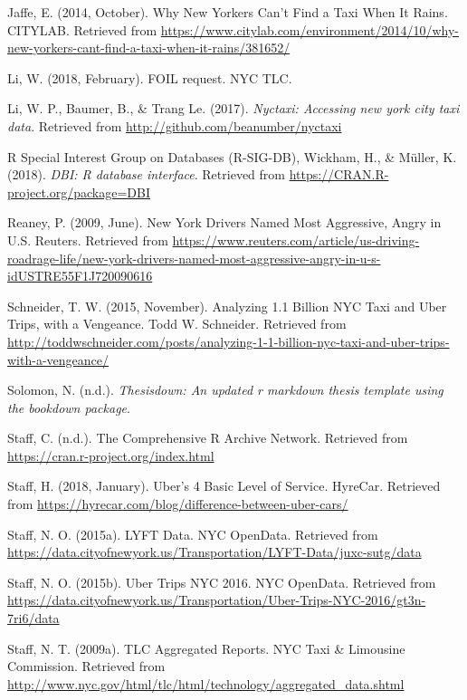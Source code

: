 \documentclass[12pt,twoside]{reedthesis}
\theoremstyle{definition}
\theoremstyle{definition}
\theoremstyle{definition}
\theoremstyle{remark}
\begin{document}
\hypertarget{ref-citylab}{}
Jaffe, E. (2014, October). Why New Yorkers Can't Find a Taxi When It
Rains. CITYLAB. Retrieved from
\url{https://www.citylab.com/environment/2014/10/why-new-yorkers-cant-find-a-taxi-when-it-rains/381652/}

\hypertarget{ref-foirequest}{}
Li, W. (2018, February). FOIL request. NYC TLC.

\hypertarget{ref-pkgnyctaxi}{}
Li, W. P., Baumer, B., \& Trang Le. (2017). \emph{Nyctaxi: Accessing new
york city taxi data}. Retrieved from
\url{http://github.com/beanumber/nyctaxi}

\hypertarget{ref-pkgDBI}{}
R Special Interest Group on Databases (R-SIG-DB), Wickham, H., \&
Müller, K. (2018). \emph{DBI: R database interface}. Retrieved from
\url{https://CRAN.R-project.org/package=DBI}

\hypertarget{ref-reaney2009}{}
Reaney, P. (2009, June). New York Drivers Named Most Aggressive, Angry
in U.S. Reuters. Retrieved from
\url{https://www.reuters.com/article/us-driving-roadrage-life/new-york-drivers-named-most-aggressive-angry-in-u-s-idUSTRE55F1J720090616}

\hypertarget{ref-schneider2015}{}
Schneider, T. W. (2015, November). Analyzing 1.1 Billion NYC Taxi and
Uber Trips, with a Vengeance. Todd W. Schneider. Retrieved from
\url{http://toddwschneider.com/posts/analyzing-1-1-billion-nyc-taxi-and-uber-trips-with-a-vengeance/}

\hypertarget{ref-pkgthesisdown}{}
Solomon, N. (n.d.). \emph{Thesisdown: An updated r markdown thesis
template using the bookdown package}.

\hypertarget{ref-cran}{}
Staff, C. (n.d.). The Comprehensive R Archive Network. Retrieved from
\url{https://cran.r-project.org/index.html}

\hypertarget{ref-uberx}{}
Staff, H. (2018, January). Uber's 4 Basic Level of Service. HyreCar.
Retrieved from
\url{https://hyrecar.com/blog/difference-between-uber-cars/}

\hypertarget{ref-datalyft}{}
Staff, N. O. (2015a). LYFT Data. NYC OpenData. Retrieved from
\url{https://data.cityofnewyork.us/Transportation/LYFT-Data/juxc-sutg/data}

\hypertarget{ref-datauberweek}{}
Staff, N. O. (2015b). Uber Trips NYC 2016. NYC OpenData. Retrieved from
\url{https://data.cityofnewyork.us/Transportation/Uber-Trips-NYC-2016/gt3n-7ri6/data}

\hypertarget{ref-datayellowmonth}{}
Staff, N. T. (2009a). TLC Aggregated Reports. NYC Taxi \& Limousine
Commission. Retrieved from
\url{http://www.nyc.gov/html/tlc/html/technology/aggregated_data.shtml}
\end{document}
